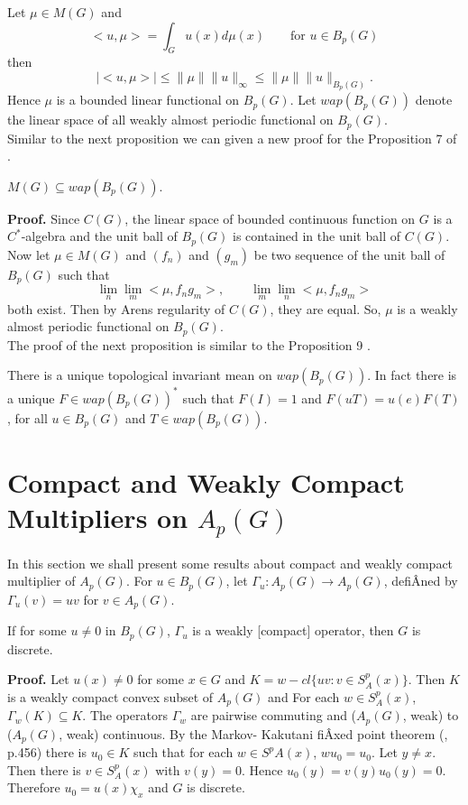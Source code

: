 Let $\mu\in M(G)$ and 
$$< u,\mu>=\int_G u(x)d\mu(x)\qquad \text{for $u\in B_p(G)$}$$
then
$$|<u,\mu>|\leq \|\mu\| \|u\|_{\infty}\leq \|\mu\| \|u\|_{B_p(G)}.$$
Hence $\mu$ is a bounded linear functional on $B_p(G)$. Let $wap(B_p(G))$ denote the linear
space of all weakly almost periodic functional on $B_p(G)$. \\
\indent
Similar to the next proposition we can given a new proof for the Proposition 7 of \cite{6}.
\begin{proposition}
$M(G)\subseteq wap(B_p(G))$.
\end{proposition}
{\bf Proof.}
Since $C(G)$, the linear space of bounded continuous function on $G$ is a $C^*$-algebra and the unit ball of $B_p(G)$ is contained in the unit ball of $C(G)$. Now let $\mu\in M(G)$ and $(f_n)$ and $(g_m)$ be two sequence of the unit ball of $B_p(G)$ such that
$$\lim_n\lim_m <\mu, f_ng_m >, \qquad \lim_m\lim_n <\mu, f_ng_m>$$
both exist. Then by Arens regularity of $C(G)$, they are equal. So, $\mu$ is a weakly almost periodic functional on $B_p(G)$.\\
\indent
The proof of the next proposition is similar to the Proposition 9 \cite{6}.
\begin{proposition}
There is a unique topological invariant mean on $wap(B_p(G))$. In fact there is a unique $F\in wap(B_p(G))^*$ such that $F(I) = 1$ and $F(uT) = u(e)F(T)$, for all $u\in B_p(G)$ and $T\in wap(B_p(G))$.
\end{proposition}
\section{Compact and Weakly Compact Multipliers on $A_p(G)$}
In this section we shall present some results about compact and weakly compact multiplier of $A_p(G)$. For $u\in B_p(G)$, let $\Gamma_u : A_p(G)\longrightarrow A_p(G)$, defiÂned by $\Gamma_u(v) = uv$ for $v\in A_p(G)$.
\begin{lemma}
If for some $u\not= 0$ in $B_p(G)$, $\Gamma_u$ is a weakly [compact] operator, then $G$ is discrete.
\end{lemma}
{\bf Proof.}
Let $u(x)\not= 0$ for some $x\in G$ and $K= w-cl\{uv : v\in S^p_A(x)\}$. Then $K$ is a weakly compact convex subset of $A_p(G)$ and For each $w\in S^p_A(x)$, $\Gamma_w(K)\subseteq K$. The operators $\Gamma_w$ are pairwise commuting and ($A_p(G)$, weak) to ($A_p(G)$, weak) continuous. By the Markov- Kakutani fiÂxed point theorem (\cite{2}, p.456) there is $u_0\in K$ such that for each $w\in S^pA(x)$, $wu_0 = u_0$. Let $y\not= x$. Then there is $v\in S^p_A(x)$ with $v(y) = 0$. Hence $u_0(y) = v(y)u_0(y) = 0$. Therefore $u_0 = u(x)\chi_x$ and $G$ is discrete.\\

